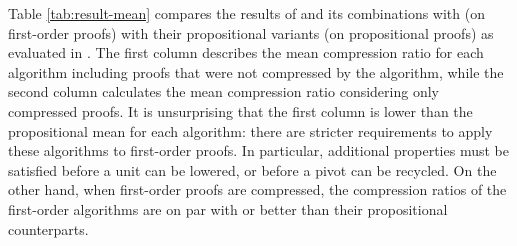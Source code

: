 Table \ref{tab:result-mean} compares the results of {\FORPI} and its combinations with {\GFOLU} (on first-order proofs) with their propositional variants (on propositional proofs) as evaluated in \cite{Boudou}. The first column describes the mean compression ratio for each algorithm including proofs that were not compressed by the algorithm, while the second column calculates the mean compression ratio considering only compressed proofs. It is unsurprising that the first column is lower than the propositional mean for each algorithm: there are stricter requirements to apply these algorithms to first-order proofs. In particular, additional properties must be satisfied before a unit can be lowered, or before a pivot can be recycled. On the other hand, when first-order proofs are compressed, the compression ratios of the first-order algorithms are on par with or better than their propositional counterparts.

